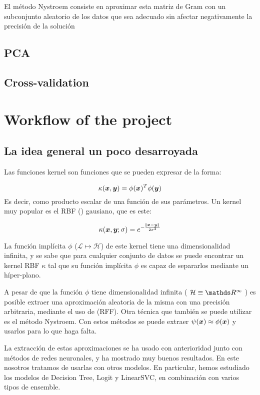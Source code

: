 \documentclass{article}
\begin{document}
El método Nystroem consiste en aproximar esta matriz de Gram con un subconjunto
aleatorio de los datos que sea adecuado sin afectar negativamente la precisión
de la solución
\subsection{PCA}
\subsection{Cross-validation}

\section{Workflow of the project}
\subsection{La idea general un poco desarroyada}

Las funciones kernel son funciones que se pueden expresar de la forma:

\begin{equation}
   \kappa(\bm{x}, \bm{y}) = \phi(\bm{x})^T\phi(\bm{y})
\end{equation}
Es decir, como producto escalar de una función de sus parámetros. Un kernel muy
popular es el RBF () gausiano, que es este:

\begin{equation}
 \kappa({\bm{x}, \bm{y}}; \sigma) = e^{-\frac{\norm{\bm{x} - \bm{y}}}{2\sigma^2}}
\end{equation}

La función implícita $\phi$ ($\mathcal{L} \mapsto \mathcal{H}$) de este kernel
tiene una dimensionalidad infinita, y se sabe que para cualquier conjunto de
datos se puede encontrar un kernel RBF $\kappa$ tal que su función implícita
$\phi$ es capaz de separarlos mediante un híper-plano.

A pesar de que la función $\phi$ tiene dimensionalidad infinita (
$\mathcal{H} \equiv \reals^\infty$
) es posible extraer una aproximación aleatoria de la misma con una precisión arbitraria,
mediante el uso de  \cite{rff} (RFF). Otra técnica
que también se puede utilizar es el método Nystroem. Con estos
métodos se puede extraer $\psi(\bm{x}) \approx \phi(\bm{x})$ y usarlos para lo que
haga falta.

La extracción de estas aproximaciones se ha usado con anterioridad junto con
métodos de redes neuronales, y ha mostrado muy buenos resultados. En este
nosotros tratamos de usarlas con otros modelos. En particular, hemos
estudiado los modelos de Decision Tree, Logit y LinearSVC, en combinación con
varios tipos de ensemble.
\end{document}
